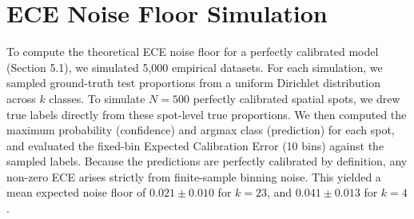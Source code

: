 \documentclass{jmlr} %
\begin{document}
\section{ECE Noise Floor Simulation}
\label{app:noise_floor}
To compute the theoretical ECE noise floor for a perfectly calibrated model (Section 5.1), we simulated 5,000 empirical datasets. For each simulation, we sampled ground-truth test proportions from a uniform Dirichlet distribution across $k$ classes. To simulate $N=500$ perfectly calibrated spatial spots, we drew true labels directly from these spot-level true proportions. We then computed the maximum probability (confidence) and argmax class (prediction) for each spot, and evaluated the fixed-bin Expected Calibration Error (10 bins) against the sampled labels. Because the predictions are perfectly calibrated by definition, any non-zero ECE arises strictly from finite-sample binning noise. This yielded a mean expected noise floor of $0.021 \pm 0.010$ for $k=23$, and $0.041 \pm 0.013$ for $k=4$.
\end{document}
